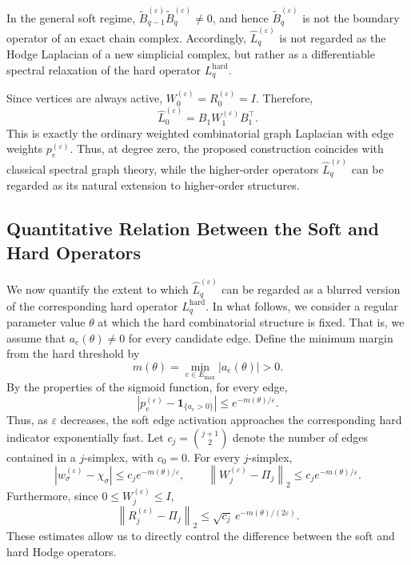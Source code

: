 \documentclass[pdflatex,sn-mathphys-num]{sn-jnl}%
\theoremstyle{thmstyleone}%
\theoremstyle{thmstyletwo}%
\theoremstyle{thmstylethree}%
\begin{document}
In the general soft regime, $\widetilde B_{q-1}^{(\varepsilon)}
\widetilde B_q^{(\varepsilon)}
\neq0$,
and hence \(\widetilde B_q^{(\varepsilon)}\) is not the boundary operator of an exact chain complex.
Accordingly, \(\widehat L_q^{(\varepsilon)}\) is not regarded as the Hodge Laplacian of a new simplicial complex, but rather as a differentiable spectral relaxation of the hard operator \(L_q^{\mathrm{hard}}\).


Since vertices are always active,
$W_0^{(\varepsilon)}
=
R_0^{(\varepsilon)}
=
I$.
Therefore,
\[
\widehat L_0^{(\varepsilon)}
=
B_1W_1^{(\varepsilon)}B_1^\top.
\]
This is exactly the ordinary weighted combinatorial graph Laplacian with edge weights \(p_e^{(\varepsilon)}\).
Thus, at degree zero, the proposed construction coincides with classical spectral graph theory, while the higher-order operators \(\widehat L_q^{(\varepsilon)}\) can be regarded as its natural extension to higher-order structures.


\subsection{Quantitative Relation Between the Soft and Hard Operators}

We now quantify the extent to which \(\widehat L_q^{(\varepsilon)}\) can be regarded as a blurred version of the corresponding hard operator \(L_q^{\mathrm{hard}}\).
In what follows, we consider a regular parameter value \(\theta\) at which the hard combinatorial structure is fixed. That is, we assume that $a_e(\theta)\neq0$
for every candidate edge.
Define the minimum margin from the hard threshold by
\[
m(\theta)
=
\min_{e\in E_{\max}}
|a_e(\theta)|
>0.
\]
By the properties of the sigmoid function, for every edge,
\[
\left|
p_e^{(\varepsilon)}
-
\mathbf 1_{\{a_e>0\}}
\right|
\le
e^{-m(\theta)/\varepsilon}.
\]
Thus, as \(\varepsilon\) decreases, the soft edge activation approaches the corresponding hard indicator exponentially fast.
Let $c_j=\binom{j+1}{2}$
denote the number of edges contained in a \(j\)-simplex, with \(c_0=0\).
For every \(j\)-simplex,
\[
\left|
w_\sigma^{(\varepsilon)}
-
\chi_\sigma
\right|
\le
c_j e^{-m(\theta)/\varepsilon},\quad\quad
\left\|
W_j^{(\varepsilon)}-\Pi_j
\right\|_2
\le
c_j e^{-m(\theta)/\varepsilon}.
\]
Furthermore, since \(0\le W_j^{(\varepsilon)}\le I\),
\[
\left\|
R_j^{(\varepsilon)}-\Pi_j
\right\|_2
\le
\sqrt{c_j}\,
e^{-m(\theta)/(2\varepsilon)}.
\]
These estimates allow us to directly control the difference between the soft and hard Hodge operators.
\end{document}
